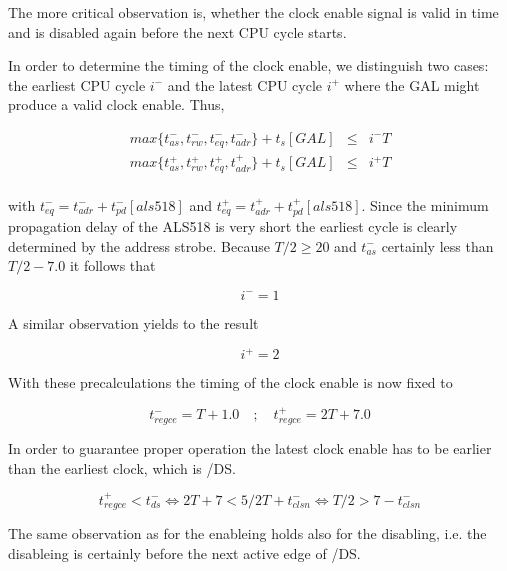 \documentclass[12pt]{article}
\newcommand{\beqn}{\begin{eqnarray*}}
\newcommand{\eeqn}{\end{eqnarray*}}
\begin{document}
The more critical observation is, whether the clock enable signal is
valid in time and is disabled again before the next CPU cycle starts.

In order to determine the timing of the clock enable, we distinguish
two cases: the earliest CPU cycle $i^-$ and the latest CPU cycle $i^+$
where the GAL might produce a valid clock enable. Thus,

\beqn
max \{ t_{as}^- , t_{rw}^- , t_{eq}^- , t_{adr}^- \} +
t_s[GAL] &\le& i^- T \\
max \{ t_{as}^+ , t_{rw}^+ , t_{eq}^+ , t_{adr}^+ \} +
t_s[GAL] &\le& i^+ T \\
\eeqn

with $t_{eq}^- = t_{adr}^- + t_{pd}^-[als518]$ and $t_{eq}^+ =
t_{adr}^+ + t_{pd}^+[als518]$. Since the minimum propagation delay of
the ALS518 is very short the earliest cycle is clearly determined by
the address strobe. Because $T/2 \ge 20$ and $t_{as}^-$ certainly less
than $T/2 - 7.0$ it follows that

\[ i^- = 1 \]

A similar observation yields to the result

\[ i^+ = 2 \]

With these precalculations the timing of the clock enable is now fixed
to

\[ t_{regce}^- = T + 1.0 \quad ; \quad t_{regce}^+ = 2T + 7.0 \]

In order to guarantee proper operation the latest clock enable has to
be earlier than the earliest clock, which is /DS.

\[ t_{regce}^+ < t_{ds}^- \Leftrightarrow 2T + 7 < 5/2 T + t_{clsn}^-
\Leftrightarrow T/2 > 7 - t_{clsn}^- \]

The same observation as for the enableing holds also for the
disabling, i.e. the disableing is certainly before the next active
edge of /DS.
\end{document}
